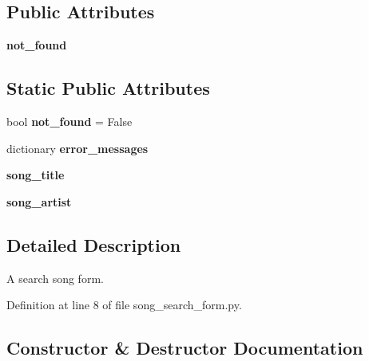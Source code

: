\subsection*{Public Attributes}
\begin{DoxyCompactItemize}
\item 
\mbox{\label{classcapstoneproject_1_1app__forms_1_1song__search__form_1_1_song_search_form_adabbde8c5b35035bd09ec632b13a69b9}} 
{\bfseries not\+\_\+found}
\end{DoxyCompactItemize}
\subsection*{Static Public Attributes}
\begin{DoxyCompactItemize}
\item 
\mbox{\label{classcapstoneproject_1_1app__forms_1_1song__search__form_1_1_song_search_form_a262225d398a01617af6cdc9df0fea7c5}} 
bool {\bfseries not\+\_\+found} = False
\item 
dictionary {\bfseries error\+\_\+messages}
\item 
{\bfseries song\+\_\+title}
\item 
{\bfseries song\+\_\+artist}
\end{DoxyCompactItemize}


\subsection{Detailed Description}
\begin{DoxyVerb}A search song form.
\end{DoxyVerb}
 

Definition at line 8 of file song\+\_\+search\+\_\+form.\+py.



\subsection{Constructor \& Destructor Documentation}
\mbox{\label{classcapstoneproject_1_1app__forms_1_1song__search__form_1_1_song_search_form_ad118522ef9949020196eacabd1cce387}} 
